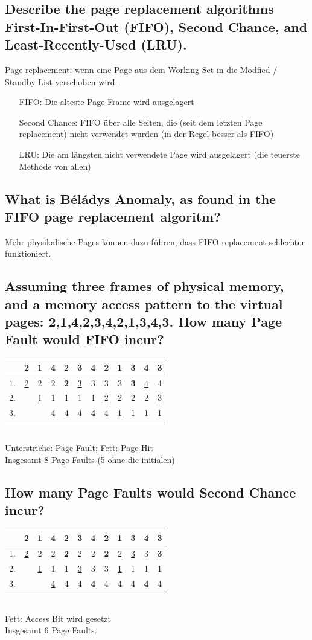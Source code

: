 \subsection{\important Describe the page replacement algorithms First-In-First-Out (FIFO), Second Chance, and Least-Recently-Used (LRU).}
Page replacement: wenn eine Page aus dem Working Set in die Modfied / Standby List verschoben wird.\\
\begin{itemize}
    \item[FIFO:] Die alteste Page Frame wird ausgelagert
    \item[Second Chance:] FIFO über alle Seiten, die (seit dem letzten Page replacement) nicht verwendet wurden (in der Regel besser als FIFO)
    \item[LRU:] Die am längsten nicht verwendete Page wird ausgelagert (die teuerste Methode von allen)
\end{itemize}

\subsection{What is Béládys Anomaly, as found in the FIFO page replacement algoritm?}
Mehr physikalische Pages können dazu führen, dass FIFO replacement schlechter funktioniert.

\subsection{Assuming three frames of physical memory, and a memory access pattern to the virtual pages: 2,1,4,2,3,4,2,1,3,4,3. How many Page Fault would FIFO incur?}
\begin{tabular}{c|ccccccccccc}
    &2&1&4&2&3&4&2&1&3&4&3\\
    \hline
    1.&\underline{2}&2&2&\textbf{2}&\underline{3}&3&3&3&\textbf{3}&\underline{4}&4\\
    2.& &\underline{1}&1&1&1&1&\underline{2}&2&2&2&\underline{3}\\
    3.& & &\underline{4}&4&4&\textbf{4}&4&\underline{1}&1&1&1
\end{tabular}
\\
Unterstriche: Page Fault; Fett: Page Hit\\
Insgesamt 8 Page Faults (5 ohne die initialen)

\subsection{How many Page Faults would Second Chance incur?}
\begin{tabular}{c|ccccccccccc}
      &2&1&4&2&3&4&2&1&3&4&3\\
    \hline
    1.&\underline{2}&2&2&\textbf{2}&2&2&\textbf{2}&2&\underline{3}&3&\textbf{3}\\
    2.& &\underline{1}&1&1&\underline{3}&3&3&\underline{1}&1&1&1\\
    3.& & &\underline{4}&4&4&\textbf{4}&4&4&4&\textbf{4}&4
\end{tabular}
\\
Fett: Access Bit wird gesetzt\\
Insgesamt 6 Page Faults.

